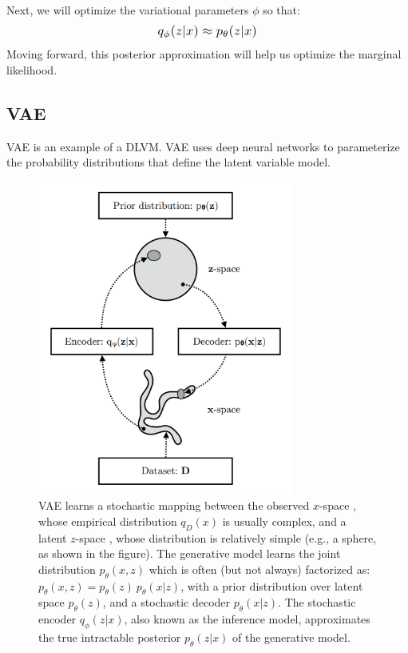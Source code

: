 \documentclass{article}
\newcommand*{\Scale}[2][4]{\scalebox{#1}{\ensuremath{#2}}}
\begin{document}
Next, we will optimize the variational parameters $ \phi $ so that:
\begin{equation}
\Scale[1.2]{ q_\phi(z|x) \approx p_\theta(z|x) }
\end{equation}
Moving forward, this posterior approximation will help us optimize the marginal likelihood.


\subsection{VAE}


VAE is an example of a DLVM. VAE uses deep neural networks to parameterize the probability distributions that define the latent variable model.
\begin{figure}[h]
    \centering
    \includegraphics[width=0.75\textwidth]{fig/vae.png}
    \caption{
	VAE learns a stochastic mapping between the observed $ x $-space , whose empirical distribution $ q_D(x) $ is usually complex, and a latent $ z $-space , whose distribution is relatively simple (e.g., a sphere, as shown in the figure). The generative model learns the joint distribution $ p_\theta(x, z) $ which is often (but not always) factorized as: $ p_\theta(x, z) = p_\theta(z) \ p_\theta(x|z) $, with a prior distribution over latent space
	$ p_\theta(z) $, and a stochastic decoder $ p_\theta(x|z) $. The stochastic encoder $ q_\phi(z|x) $, also known as the inference model, approximates the true intractable posterior $ p_\theta(z|x) $ of the generative model.
    }
    \label{fig:vae}
\end{figure}
\end{document}
